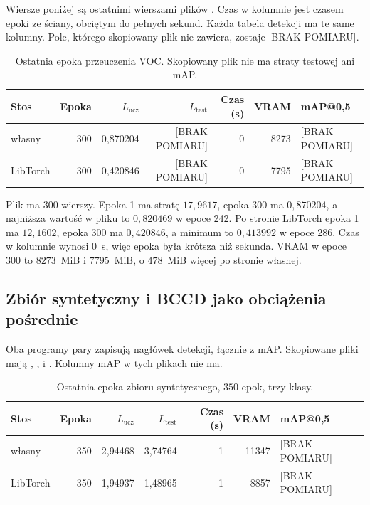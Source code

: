Wiersze poniżej są ostatnimi wierszami plików . Czas w kolumnie  jest czasem epoki ze ściany, obciętym do pełnych sekund. Każda tabela detekcji ma te same kolumny. Pole, którego skopiowany plik nie zawiera, zostaje [BRAK POMIARU].

\begin{table}[ht]
\centering
\caption{Ostatnia epoka przeuczenia VOC. Skopiowany plik nie ma straty testowej ani mAP.}
\label{tab:overfit}
\small
\begin{tabular}{lrrrrrl}
\toprule
Stos & Epoka & \(L_{\mathrm{ucz}}\) & \(L_{\mathrm{test}}\) & Czas (s) & VRAM & mAP@0,5 \\
\midrule
własny & 300 & 0{,}870204 & [BRAK POMIARU] & 0 & 8273 & [BRAK POMIARU] \\
LibTorch & 300 & 0{,}420846 & [BRAK POMIARU] & 0 & 7795 & [BRAK POMIARU] \\
\bottomrule
\end{tabular}
\end{table}

Plik  ma 300 wierszy. Epoka 1 ma stratę \(17{,}9617\), epoka 300 ma \(0{,}870204\), a najniższa wartość w pliku to \(0{,}820469\) w epoce 242. Po stronie LibTorch epoka 1 ma \(12{,}1602\), epoka 300 ma \(0{,}420846\), a minimum to \(0{,}413992\) w epoce 286. Czas w kolumnie wynosi \(0\)~s, więc epoka była krótsza niż sekunda. VRAM w epoce 300 to \(8273\)~MiB i \(7795\)~MiB, o \(478\)~MiB więcej po stronie własnej.

\subsection{Zbiór syntetyczny i BCCD jako obciążenia pośrednie}

Oba programy pary zapisują nagłówek detekcji, łącznie z mAP. Skopiowane pliki mają , ,  i . Kolumny mAP w tych plikach nie ma.

\begin{table}[ht]
\centering
\caption{Ostatnia epoka zbioru syntetycznego, \(350\) epok, trzy klasy.}
\label{tab:synthetic}
\small
\begin{tabular}{lrrrrrl}
\toprule
Stos & Epoka & \(L_{\mathrm{ucz}}\) & \(L_{\mathrm{test}}\) & Czas (s) & VRAM & mAP@0,5 \\
\midrule
własny & 350 & 2{,}94468 & 3{,}74764 & 1 & 11347 & [BRAK POMIARU] \\
LibTorch & 350 & 1{,}94937 & 1{,}48965 & 1 & 8857 & [BRAK POMIARU] \\
\bottomrule
\end{tabular}
\end{table}

